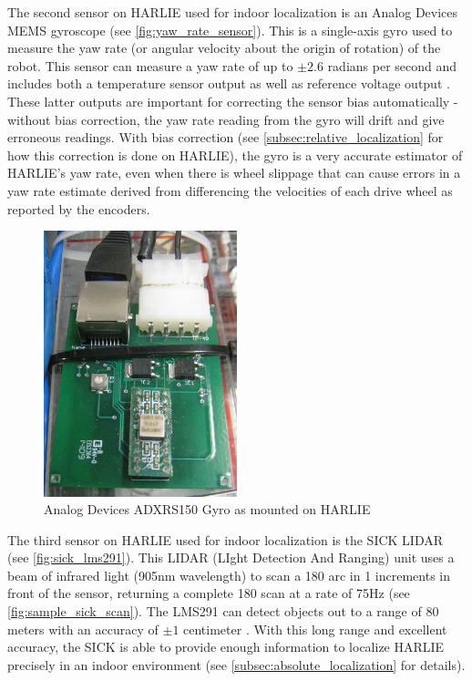 The second sensor on HARLIE used for indoor localization is an Analog Devices MEMS gyroscope (see \autoref{fig:yaw_rate_sensor}). This is a single-axis gyro used to measure the yaw rate (or angular velocity about the origin of rotation) of the robot. This sensor can measure a yaw rate of up to $\pm2.6$ radians per second and includes both a temperature sensor output as well as reference voltage output \autocite{ADXRS150Datasheet}. These latter outputs are important for correcting the sensor bias automatically - without bias correction, the yaw rate reading from the gyro will drift and give erroneous readings. With bias correction (see \autoref{subsec:relative_localization} for how this correction is done on HARLIE), the gyro is a very accurate estimator of HARLIE's yaw rate, even when there is wheel slippage that can cause errors in a yaw rate estimate derived from differencing the velocities of each drive wheel as reported by the encoders.

\begin{figure}
\centering
\includegraphics[width=0.5\textwidth]{images/yaw_rate_sensor}
\caption{Analog Devices ADXRS150 Gyro as mounted on HARLIE \label{fig:yaw_rate_sensor}}
\end{figure}

The third sensor on HARLIE used for indoor localization is the SICK LIDAR (see \autoref{fig:sick_lms291}). This LIDAR (LIght Detection And Ranging) unit uses a beam of infrared light (905nm wavelength) to scan a 180\degree{} arc in 1\degree{} increments in front of the sensor, returning a complete 180\degree{} scan at a rate of 75Hz (see \autoref{fig:sample_sick_scan}). The LMS291 can detect objects out to a range of 80 meters with an accuracy of $\pm1$ centimeter \autocite{SICKLMS291Datasheet}. With this long range and excellent accuracy, the SICK is able to provide enough information to localize HARLIE precisely in an indoor environment (see \autoref{subsec:absolute_localization} for details). 

